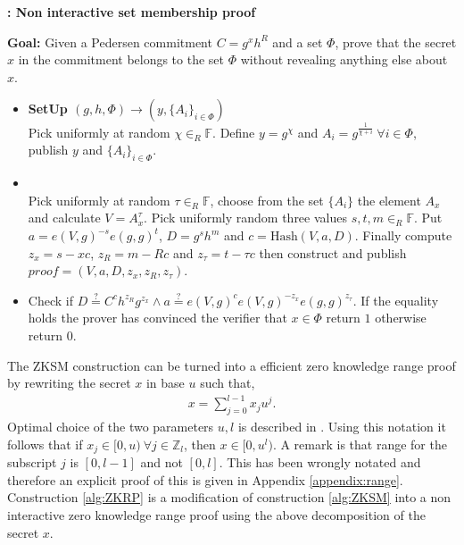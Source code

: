 \begin{algorithm}[]
\caption{\textbf{: Non interactive set membership proof}}
\textbf{Goal:} Given a Pedersen commitment $C=g^x h^R$ and a set $\Phi$, prove that the secret $x$ in the commitment belongs to the set $\Phi$ without revealing anything else about $x$.
\vspace{2pt} \hline \vspace{2pt}
\begin{itemize}
  \item\textbf{SetUp $(g,h,\Phi)\xrightarrow[]{}(y,\{A_{i}\}_{i\in\Phi})$}\\
Pick uniformly at random $\chi\in_R\mathds{F}$. Define $y=g^\chi$ and $A_i=g^{\frac{1}{\chi+i}} \:\forall i\in\Phi$, publish $y$ and $\{A_i\}_{i\in\Phi}$.

\item{}\\
Pick uniformly at random $\tau\in_R\mathds{F}$, choose from the set $\{A_i\}$ the element $A_x$ and calculate $V=A_x^\tau$. Pick uniformly random three values $s,t,m\in_R\mathds{F}$. Put $a=e(V,g)^{-s}e(g,g)^t$, $D=g^sh^m$ and $c=\text{Hash}(V,a,D)$. Finally compute $z_x = s-x c$, $z_R = m-Rc$ and $z_\tau= t-\tau c$ then construct and publish $\textit{proof} = (V,a,D,z_x,z_R,z_\tau)$.

\item{}
Check if $D\overset{?}{=}C^ch^{z_R}g^{z_x}\wedge a \overset{?}{=} e(V,g)^c e(V,g)^{-z_x}e(g,g)^{z_\tau}$. If the equality holds the prover has convinced the verifier that $x\in\Phi$ return $1$ otherwise return $0$.
\end{itemize}
\label{alg:ZKSM}
\end{algorithm}

The ZKSM construction can be turned into a efficient zero knowledge range proof by rewriting the secret $x$ in base $u$ such that,
\begin{align*}
    x = \sum_{j=0}^{l-1} x_ju^j.
\end{align*}
Optimal choice of the two parameters $u,l$ is described in \cite{RANGE-SET}. 
Using this notation it follows that if $x_j\in[0,u)\: \forall j\in\mathds{Z}_l$, then $x\in[0,u^l)$. A remark is that range for the subscript $j$ is $[0,l-1]$ and not $[0,l]$.  This has been wrongly notated \cite{RANGE-SET,ZKRP_Morais} and therefore an explicit proof of this is given in Appendix \ref{appendix:range}. Construction \ref{alg:ZKRP} is a modification of construction \ref{alg:ZKSM} into a non interactive zero knowledge range proof using the above decomposition of the secret $x$.

